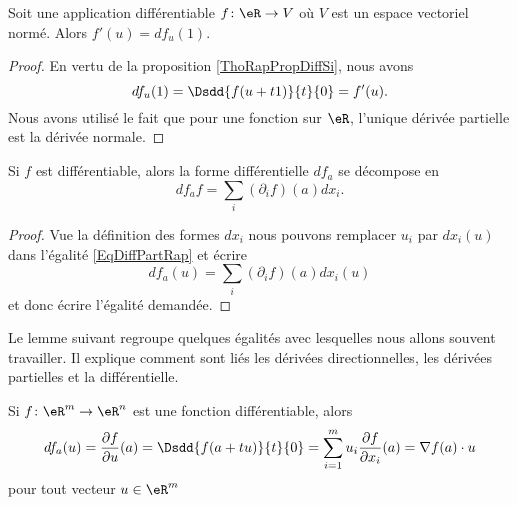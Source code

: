 \begin{corollary}       \label{CORooTBUMooHPncPH}
    Soit une application différentiable \( f\colon \eR\to V\) où \( V\) est un espace vectoriel normé. Alors \( f'(u)=df_u(1)\).
\end{corollary}

\begin{proof}
    En vertu de la proposition \ref{ThoRapPropDiffSi}, nous avons
    \begin{equation}
        df_u(1)=\Dsdd{ f(u+t1) }{t}{0}=f'(u).
    \end{equation}
    Nous avons utilisé le fait que pour une fonction sur \( \eR\), l'unique dérivée partielle est la dérivée normale.
\end{proof}

\begin{corollary}       \label{CORooXURPooQMKvBl}
    Si \( f\) est différentiable, alors la forme différentielle \( df_a\) se décompose en
    \begin{equation}
        df_af=\sum_i(\partial_if)(a)dx_i.
    \end{equation}
\end{corollary}

\begin{proof}
    Vue la définition des formes \( dx_i\) nous pouvons remplacer \( u_i\) par \( dx_i(u)\) dans l'égalité \eqref{EqDiffPartRap} et écrire
    \begin{equation}
        df_a(u)=\sum_i(\partial_if)(a)dx_i(u)
    \end{equation}
    et donc écrire l'égalité demandée.
\end{proof}

Le lemme suivant regroupe quelques égalités avec lesquelles nous allons souvent travailler. Il explique comment sont liés les dérivées directionnelles, les dérivées partielles et la différentielle.
\begin{lemma}		\label{LemdfaSurLesPartielles}
	Si $f\colon \eR^m\to \eR^n$ est une fonction différentiable, alors
	\begin{equation}
        df_a(u)=\frac{ \partial f }{ \partial u }(a)=\Dsdd{ f(a+tu) }{t}{0}=\sum_{i=1}^mu_i\frac{ \partial f }{ \partial x_i }(a)=\nabla f(a)\cdot u
	\end{equation}
	pour tout vecteur $u\in\eR^m$
\end{lemma}


